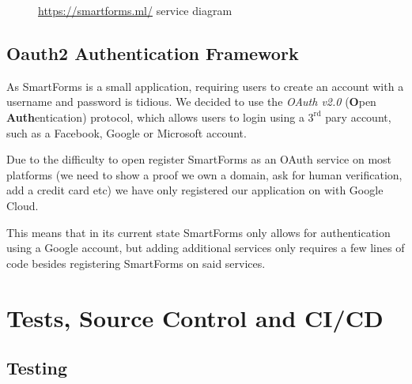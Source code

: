 \documentclass[11pt, a4paper]{report}
\begin{document}
\begin{figure}[!h]
	\centering
	\caption{\url{https://smartforms.ml/} service diagram}
	\label{smartformsml-diagram}
\end{figure}


\section{Oauth2 Authentication Framework}

As SmartForms is a small application, requiring users to create an account with a username and password is tidious. We decided to use the \textit{OAuth v2.0}\cite{oauth2} (\textbf{O}pen \textbf{Auth}entication) protocol, which allows users to login using a $3^\textrm{rd}$ pary account, such as a Facebook, Google or Microsoft account.

Due to the difficulty to open register SmartForms as an OAuth service on most platforms (we need to show a proof we own a domain, ask for human verification, add a credit card etc) we have only registered our application on with Google Cloud.

This means that in its current state SmartForms only allows for authentication using a Google account, but adding additional services only requires a few lines of code besides registering SmartForms on said services.


\chapter{Tests, Source Control and CI/CD}

\section{Testing}
\end{document}
